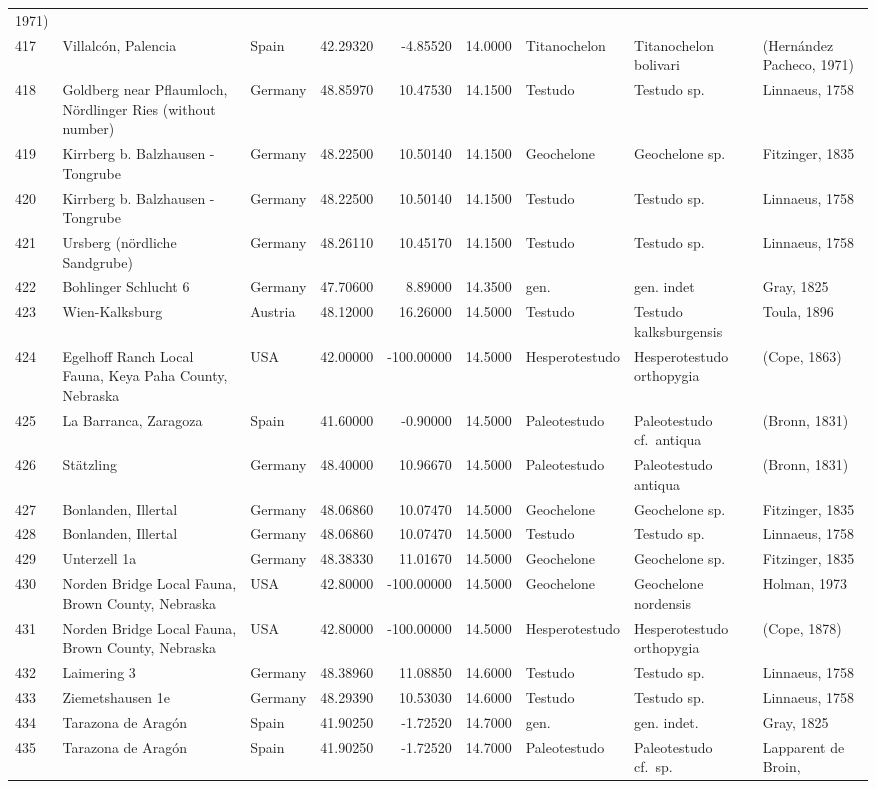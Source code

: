 \documentclass[]{article}
\begin{document}
\begin{longtable}[]{@{}lllrrrlll@{}}
1971)\tabularnewline
417 & Villalcón, Palencia & Spain & 42.29320 & -4.85520 & 14.0000 &
Titanochelon & Titanochelon bolivari & (Hernández Pacheco,
1971)\tabularnewline
418 & Goldberg near Pflaumloch, Nördlinger Ries (without number) &
Germany & 48.85970 & 10.47530 & 14.1500 & Testudo & Testudo sp. &
Linnaeus, 1758\tabularnewline
419 & Kirrberg b. Balzhausen - Tongrube & Germany & 48.22500 & 10.50140
& 14.1500 & Geochelone & Geochelone sp. & Fitzinger, 1835\tabularnewline
420 & Kirrberg b. Balzhausen - Tongrube & Germany & 48.22500 & 10.50140
& 14.1500 & Testudo & Testudo sp. & Linnaeus, 1758\tabularnewline
421 & Ursberg (nördliche Sandgrube) & Germany & 48.26110 & 10.45170 &
14.1500 & Testudo & Testudo sp. & Linnaeus, 1758\tabularnewline
422 & Bohlinger Schlucht 6 & Germany & 47.70600 & 8.89000 & 14.3500 &
gen. & gen. indet & Gray, 1825\tabularnewline
423 & Wien-Kalksburg & Austria & 48.12000 & 16.26000 & 14.5000 & Testudo
& Testudo kalksburgensis & Toula, 1896\tabularnewline
424 & Egelhoff Ranch Local Fauna, Keya Paha County, Nebraska & USA &
42.00000 & -100.00000 & 14.5000 & Hesperotestudo & Hesperotestudo
orthopygia & (Cope, 1863)\tabularnewline
425 & La Barranca, Zaragoza & Spain & 41.60000 & -0.90000 & 14.5000 &
Paleotestudo & Paleotestudo cf.~antiqua & (Bronn, 1831)\tabularnewline
426 & Stätzling & Germany & 48.40000 & 10.96670 & 14.5000 & Paleotestudo
& Paleotestudo antiqua & (Bronn, 1831)\tabularnewline
427 & Bonlanden, Illertal & Germany & 48.06860 & 10.07470 & 14.5000 &
Geochelone & Geochelone sp. & Fitzinger, 1835\tabularnewline
428 & Bonlanden, Illertal & Germany & 48.06860 & 10.07470 & 14.5000 &
Testudo & Testudo sp. & Linnaeus, 1758\tabularnewline
429 & Unterzell 1a & Germany & 48.38330 & 11.01670 & 14.5000 &
Geochelone & Geochelone sp. & Fitzinger, 1835\tabularnewline
430 & Norden Bridge Local Fauna, Brown County, Nebraska & USA & 42.80000
& -100.00000 & 14.5000 & Geochelone & Geochelone nordensis & Holman,
1973\tabularnewline
431 & Norden Bridge Local Fauna, Brown County, Nebraska & USA & 42.80000
& -100.00000 & 14.5000 & Hesperotestudo & Hesperotestudo orthopygia &
(Cope, 1878)\tabularnewline
432 & Laimering 3 & Germany & 48.38960 & 11.08850 & 14.6000 & Testudo &
Testudo sp. & Linnaeus, 1758\tabularnewline
433 & Ziemetshausen 1e & Germany & 48.29390 & 10.53030 & 14.6000 &
Testudo & Testudo sp. & Linnaeus, 1758\tabularnewline
434 & Tarazona de Aragón & Spain & 41.90250 & -1.72520 & 14.7000 & gen.
& gen. indet. & Gray, 1825\tabularnewline
435 & Tarazona de Aragón & Spain & 41.90250 & -1.72520 & 14.7000 &
Paleotestudo & Paleotestudo cf.~sp. & Lapparent de Broin,

\end{longtable}
\end{document}
